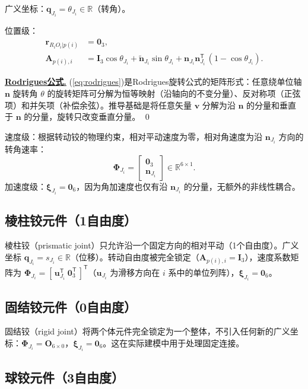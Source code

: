 \documentclass[10pt,a4paper]{book}
\theoremstyle{thmstyle}
\theoremstyle{defstyle}
\theoremstyle{prostyle}
\renewenvironment{proof}[1][证明]{\par{\kaishu \underline{\textbf{#1.}}} \;\fangsong}{\qed\par}
\newcommand{\T}{^{\mathsf{T}}}
\renewcommand{\vec}[1]{\bm{#1}}
\newcommand{\mat}[1]{\bm{#1}}
\newcommand{\tildev}[1]{\tilde{#1}}
\newcommand{\R}{\mathbb{R}}
\begin{document}
广义坐标：$\vec{q}_{J_i} = \theta_{J_i}\in\R$（转角）。

位置级：
\begin{align}
\vec{r}_{R_iO_i|p(i)} &= \vec{0}_3,\\[4pt]
\mat{A}_{p(i),i} &= \mat{I}_3\cos\theta_{J_i}
+ \tildev{\vec{n}}_{J_i}\sin\theta_{J_i}
+ \vec{n}_{J_i}\vec{n}_{J_i}\T\,(1-\cos\theta_{J_i}).
\label{eq:rodrigues}
\end{align}
\begin{proof}[Rodrigues公式]
(\ref{eq:rodrigues})是Rodrigues旋转公式的矩阵形式：任意绕单位轴 $\vec{n}$ 旋转角 $\theta$ 的旋转矩阵可分解为恒等映射（沿轴向的不变分量）、反对称项（正弦项）和并矢项（补偿余弦）。推导基础是将任意矢量 $\vec{v}$ 分解为沿 $\vec{n}$ 的分量和垂直于 $\vec{n}$ 的分量，旋转只改变垂直分量。
\end{proof}

速度级：根据转动铰的物理约束，相对平动速度为零，相对角速度为沿 $\vec{n}_{J_i}$ 方向的转角速率：
\[
\mat{\Phi}_{J_i} = \begin{bmatrix} \mat{0}_3 \\ \vec{n}_{J_i} \end{bmatrix}\in\R^{6\times 1}.
\]
加速度级：$\vec{\xi}_{J_i} = \vec{0}_6$，因为角加速度也仅有沿 $\vec{n}_{J_i}$ 的分量，无额外的非线性耦合。

\subsection{棱柱铰元件（1自由度）}

棱柱铰（prismatic joint）只允许沿一个固定方向的相对平动（1个自由度）。广义坐标 $\vec{q}_{J_i} = s_{J_i}\in\R$（位移）。转动自由度被完全锁定（$\mat{A}_{p(i),i} = \mat{I}_3$），速度系数矩阵为 $\mat{\Phi}_{J_i} = [\,\vec{u}_{J_i}\T\; \mat{0}_3\T\,]\T$（$\vec{u}_{J_i}$ 为滑移方向在 $i$ 系中的单位列阵），$\vec{\xi}_{J_i} = \vec{0}_6$。

\subsection{固结铰元件（0自由度）}

固结铰（rigid joint）将两个体元件完全锁定为一个整体，不引入任何新的广义坐标：$\mat{\Phi}_{J_i} = \mat{O}_{6\times 0}$，$\vec{\xi}_{J_i} = \vec{0}_6$。这在实际建模中用于处理固定连接。

\subsection{球铰元件（3自由度）}
\end{document}
